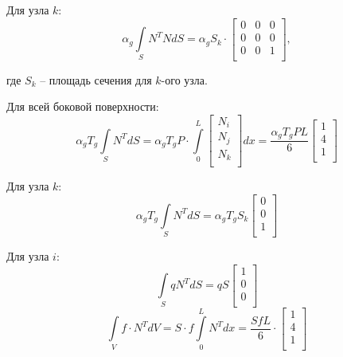 \documentclass{bmstu}
\begin{document}
\begin{center}
\end{center}

Для узла $k$:
\[\alpha_g \int \limits_S N^T N dS = \alpha_g S_k 
\cdot \begin{bmatrix}
0 & 0 & 0 \\
0 & 0 & 0 \\
0 & 0 & 1 \\
\end{bmatrix},\]

где $S_k$ -- площадь сечения для $k$-ого узла.

Для всей боковой поверхности:
\[\alpha_g T_g \int \limits_S N^T dS = \alpha_g T_g P \cdot \int \limits_0^L 
\begin{bmatrix}
N_i \\
N_j \\
N_k \\
\end{bmatrix} dx = 
\frac{\alpha_g T_g P L}{6}
\begin{bmatrix}
1 \\
4 \\
1 \\
\end{bmatrix} \]

Для узла $k$:
\[\alpha_g T_g \int \limits_S N^T dS = \alpha_g T_g S_k 
\begin{bmatrix}
0 \\
0 \\
1 \\
\end{bmatrix} 
\]

Для узла $i$:
\[
\int \limits_S q N^T dS = qS
\begin{bmatrix}
1 \\
0 \\
0 \\
\end{bmatrix} 
\]
\[
\int \limits_V f \cdot N^T dV = S \cdot f \int \limits_0^L N^T dx = \frac{SfL}{6} \cdot
\begin{bmatrix}
1 \\
4 \\
1 \\
\end{bmatrix}
\]
\end{document}
